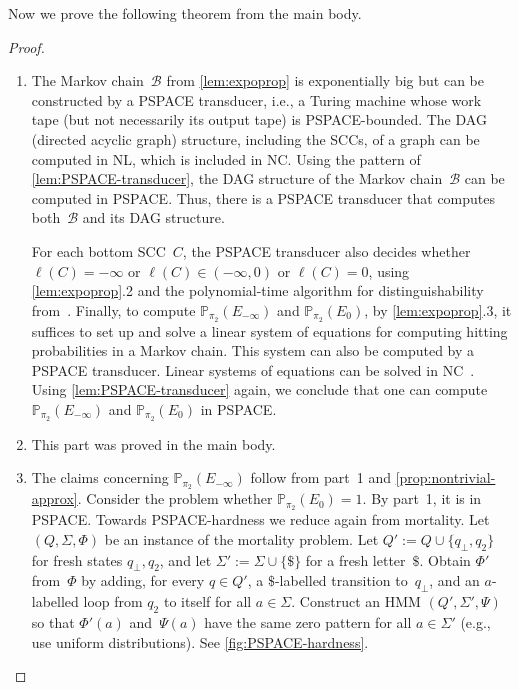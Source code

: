 \documentclass[a4paper,UKenglish,cleveref, autoref,mathscr]{lipics-v2019}
\newcommand{\PP}{\mathbb{P}}
\newcommand{\1}{\mathbbm{1}}
\newcommand{\B}{\mathcal{B}}
\begin{document}
Now we prove the following theorem from the main body.
\thmqualprob*
\begin{proof}
\begin{enumerate}
\item
The Markov chain~$\B$ from \cref{lem:expoprop} is exponentially big but can be constructed by a PSPACE transducer, i.e., a Turing machine whose work tape (but not necessarily its output tape) is PSPACE-bounded.
The DAG (directed acyclic graph) structure, including the SCCs, of a graph can be computed in NL, which is included in NC.
Using the pattern of \cref{lem:PSPACE-transducer}, the DAG structure of the Markov chain~$\B$ can be computed in PSPACE.
Thus, there is a PSPACE transducer that computes both~$\B$ and its DAG structure.

For each bottom SCC~$C$, the PSPACE transducer also decides whether $\ell(C) = -\infty$ or $\ell(C) \in (-\infty,0)$ or $\ell(C) = 0$, using \cref{lem:expoprop}.2 and the polynomial-time algorithm for distinguishability from~\cite{kief14}.
Finally, to compute $\PP_{\pi_2}(E_{-\infty})$ and $\PP_{\pi_2}(E_0)$, by \cref{lem:expoprop}.3, it suffices to set up and solve a linear system of equations for computing hitting probabilities in a Markov chain.
This system can also be computed by a PSPACE transducer.
Linear systems of equations can be solved in NC~\cite[Theorem~5]{BorodinGathenHopcroft82}.
Using \cref{lem:PSPACE-transducer} again, we conclude that one can compute $\PP_{\pi_2}(E_{-\infty})$ and $\PP_{\pi_2}(E_0)$ in PSPACE.
\item This part was proved in the main body.
\item The claims concerning $\PP_{\pi_2}(E_{-\infty})$ follow from part~1 and \cref{prop:nontrivial-approx}.
Consider the problem whether $\PP_{\pi_2}(E_{0}) = 1$.
By part~1, it is in PSPACE.
Towards PSPACE-hardness we reduce again from mortality.
Let $(Q,\Sigma,\Phi)$ be an instance of the mortality problem.
Let $Q' := Q \cup \{q_\bot, q_2\}$ for fresh states $q_\bot,q_2$, and let $\Sigma' := \Sigma \cup \{\$\}$ for a fresh letter~$\$$.
Obtain $\Phi'$ from~$\Phi$ by adding, for every $q \in Q'$, a $\$$-labelled transition to~$q_\bot$, and an $a$-labelled loop from $q_2$ to itself for all $a \in \Sigma$.
Construct an HMM $(Q',\Sigma',\Psi)$ so that $\Phi'(a)$ and~$\Psi(a)$ have the same zero pattern for all $a \in \Sigma'$ (e.g., use uniform distributions).
See \cref{fig:PSPACE-hardness}.
\begin{figure}[ht]
\begin{center}
\end{center}
\end{figure}
\end{enumerate}
\end{proof}
\end{document}
